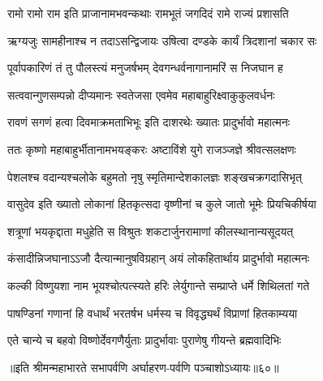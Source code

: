 \twolineshloka
{रामो रामो राम इति प्राजानामभवन्कथाः}
{रामभूतं जगदिदं रामे राज्यं प्रशासति}


\twolineshloka
{ऋग्यजुः सामहीनाश्च न तदाऽसन्द्विजायः}
{उषित्वा दण्डके कार्यं त्रिदशानां चकार सः}


\twolineshloka
{पूर्वापकारिणं तं तु पौलस्त्यं मनुजर्षभम्}
{देवगन्धर्वनागानामरिं स निजघान ह}


\twolineshloka
{सत्ववान्गुणसम्पन्नो दीप्यमानः स्वतेजसा}
{एवमेव महाबाहुरिक्ष्वाकुकुलवर्धनः}


\twolineshloka
{रावणं सगणं हत्वा दिवमाक्रमताभिभूः}
{इति दाशरथेः ख्यातः प्रादुर्भावो महात्मनः}


\twolineshloka
{ततः कृष्णो महाबाहुर्भीतानामभयङ्करः}
{अष्टाविंशे युगे राजञ्जज्ञे श्रीवत्सलक्षणः}


\twolineshloka
{पेशलश्च वदान्यश्चलोके बहुमतो नृषु}
{स्मृतिमान्देशकालज्ञः शङ्खचक्रगदासिभृत्}


\twolineshloka
{वासुदेव इति ख्यातो लोकानां हितकृत्सदा}
{वृष्णीनां च कुले जातो भूमेः प्रियचिकीर्षया}


\twolineshloka
{शत्रूणां भयकृद्दाता मधुहेति स विश्रुतः}
{शकटार्जुनरामाणां कीलस्थानान्यसूदयत्}


\twolineshloka
{कंसादीन्निजघानाऽऽजौ दैत्यान्मानुषविग्रहान्}
{अयं लोकहितार्थाय प्रादुर्भावो महात्मनः}


\twolineshloka
{कल्की विष्णुयशा नाम भूयश्चोत्पत्स्यते हरिः}
{लेर्युगान्ते सम्प्राप्ते धर्मे शिथिलतां गते}


\twolineshloka
{पाषण्डिनां गणानां हि वधार्थं भरतर्षभ}
{धर्मस्य च विवृद्ध्यर्थं विप्राणां हितकाम्यया}


\twolineshloka
{एते चान्ये च बहवो विष्णोर्देवगणैर्युताः}
{प्रादुर्भावाः पुराणेषु गीयन्ते ब्रह्मवादिभिः}


॥इति श्रीमन्महाभारते सभापर्वणि अर्घाहरण-पर्वणि पञ्चाशोऽध्यायः॥६०॥

\closesection